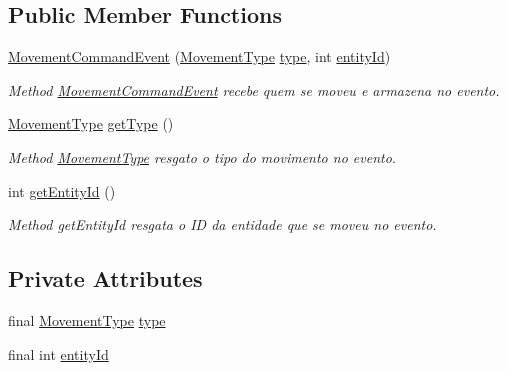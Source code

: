 \subsection*{Public Member Functions}
\begin{DoxyCompactItemize}
\item 
\hyperlink{classbr_1_1unb_1_1unbomber_1_1event_1_1_movement_command_event_ac3a7bba9e58b201bf8824b05316b37b1}{Movement\+Command\+Event} (\hyperlink{enumbr_1_1unb_1_1unbomber_1_1event_1_1_movement_command_event_1_1_movement_type}{Movement\+Type} \hyperlink{classbr_1_1unb_1_1unbomber_1_1event_1_1_movement_command_event_a122cdd825b8fd6e2af29546476c8c2f2}{type}, int \hyperlink{classbr_1_1unb_1_1unbomber_1_1event_1_1_movement_command_event_a1d3baa6112e6ec205595de4d5ccb1143}{entity\+Id})
\begin{DoxyCompactList}\small\item\em Method \hyperlink{classbr_1_1unb_1_1unbomber_1_1event_1_1_movement_command_event}{Movement\+Command\+Event} recebe quem se moveu e armazena no evento. \end{DoxyCompactList}\item 
\hyperlink{enumbr_1_1unb_1_1unbomber_1_1event_1_1_movement_command_event_1_1_movement_type}{Movement\+Type} \hyperlink{classbr_1_1unb_1_1unbomber_1_1event_1_1_movement_command_event_abfaff2a0f27bc52a597742b1c20a5957}{get\+Type} ()
\begin{DoxyCompactList}\small\item\em Method \hyperlink{enumbr_1_1unb_1_1unbomber_1_1event_1_1_movement_command_event_1_1_movement_type}{Movement\+Type} resgato o tipo do movimento no evento. \end{DoxyCompactList}\item 
int \hyperlink{classbr_1_1unb_1_1unbomber_1_1event_1_1_movement_command_event_a8d8a5d91757233ffad5a67b980d4a7fd}{get\+Entity\+Id} ()
\begin{DoxyCompactList}\small\item\em Method get\+Entity\+Id resgata o I\+D da entidade que se moveu no evento. \end{DoxyCompactList}\end{DoxyCompactItemize}
\subsection*{Private Attributes}
\begin{DoxyCompactItemize}
\item 
final \hyperlink{enumbr_1_1unb_1_1unbomber_1_1event_1_1_movement_command_event_1_1_movement_type}{Movement\+Type} \hyperlink{classbr_1_1unb_1_1unbomber_1_1event_1_1_movement_command_event_a122cdd825b8fd6e2af29546476c8c2f2}{type}
\item 
final int \hyperlink{classbr_1_1unb_1_1unbomber_1_1event_1_1_movement_command_event_a1d3baa6112e6ec205595de4d5ccb1143}{entity\+Id}
\end{DoxyCompactItemize}


